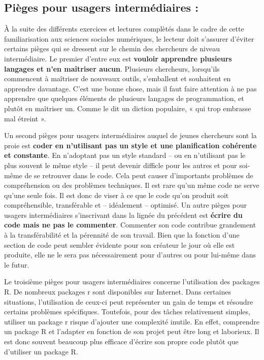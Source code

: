 \documentclass[
  letterpaper,
]{scrbook}
\begin{document}
\hypertarget{piuxe8ges-pour-usagers-intermuxe9diaires}{%
\subsection{Pièges pour usagers intermédiaires
:}\label{piuxe8ges-pour-usagers-intermuxe9diaires}}

À la suite des différents exercices et lectures complètés dans le cadre
de cette familiarisation aux sciences sociales numériques, le lecteur
doit s'assurer d'éviter certains pièges qui se dressent sur le chemin
des chercheurs de niveau intermédiaire. Le premier d'entre eux est
\textbf{vouloir apprendre plusieurs langages et n'en maîtriser aucun}.
Plusieurs chercheurs, lorsqu'ils commencent à maîtriser de nouveaux
outils, s'emballent et souhaitent en apprendre davantage. C'est une
bonne chose, mais il faut faire attention à ne pas apprendre que
quelques éléments de plusieurs langages de programmation, et plutôt en
maîtriser un. Comme le dit un diction populaire, « qui trop embrasse mal
étreint ».

Un second pièges pour usagers intermédiaires auquel de jeunes chercheurs
sont la proie est \textbf{coder en n'utilisant pas un style et une
planification cohérente et constante}. En n'adoptant pas un style
standard -- ou en n'utilisant pas le plus souvent le même style -- il
peut devenir difficle pour les autres et pour soi-même de se retrouver
dans le code. Cela peut causer d'importants problèmes de compréhension
ou des problèmes techniques. Il est rare qu'un même code ne serve qu'une
seule fois. Il est donc de viser à ce que le code qu'on produit soit
compréhensible, transférable et -- idéalement -- optimisé. Un autre
pièges pour usagers intermédiaires s'inscrivant dans la lignée du
précédent est \textbf{écrire du code mais ne pas le commenter}.
Commenter son code contribue grandement à la transférabilité et la
pérennité de son travail. Bien que la fonction d'une section de code
peut sembler évidente pour son créateur le jour où elle est produite,
elle ne le sera pas nécessairement pour d'autres ou pour lui-même dans
le futur.

Le troisième pièges pour usagers intermédiaires concerne l'utilisation
des packages R. De nombreux packages r sont disponibles sur Internet.
Dans certaines situations, l'utilisation de ceux-ci peut représenter un
gain de temps et résoudre certains problèmes spécifiques. Toutefois,
pour des tâches relativement simples, utiliser un package r risque
d'ajouter une complexité inutile. En effet, comprendre un package R et
l'adapter en fonction de son projet peut être long et laborieux. Il est
donc souvent beaucoup plus efficace d'écrire son propre code plutôt que
d'utiliser un package R.
\end{document}
